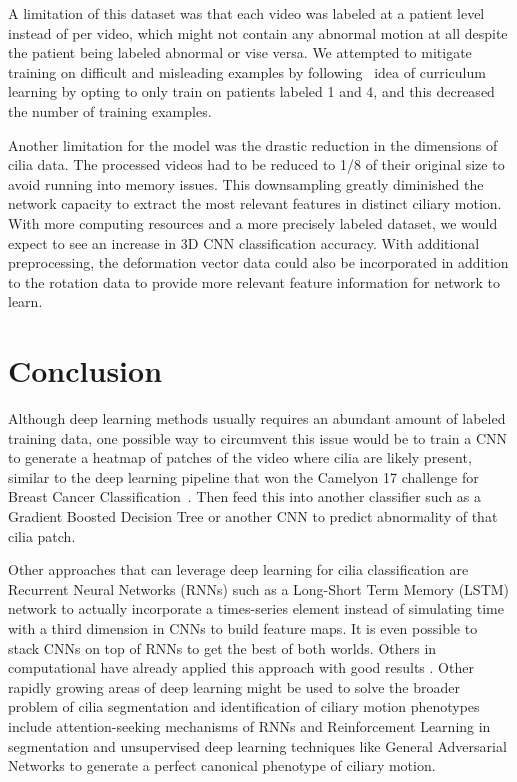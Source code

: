 A limitation of this dataset was that each video was labeled at a patient level instead of per video, which might not contain any abnormal motion at all despite the patient being labeled abnormal or vise versa. We attempted to mitigate training on difficult and misleading examples by following~\cite{bengio2009curriculum} idea of curriculum learning by opting to only train on patients labeled 1 and 4, and this decreased the number of training examples.

Another limitation for the model was the drastic reduction in the dimensions of cilia data. The processed videos had to be reduced to 1/8 of their original size to avoid running into memory issues. This downsampling greatly diminished the network capacity to extract the most relevant features in distinct ciliary motion. With more computing resources and a more precisely labeled dataset, we would expect to see an increase in 3D CNN classification accuracy. With additional preprocessing, the deformation vector data could also be incorporated in addition to the rotation data to provide more relevant feature information for network to learn.

\section{Conclusion}

Although deep learning methods usually requires an abundant amount of labeled training data, one possible way to circumvent this issue would be to train a CNN to generate a heatmap of patches of the video where cilia are likely present, similar to the deep learning pipeline that won the Camelyon 17 challenge for Breast Cancer Classification~\cite{wang2016deep}. Then feed this into another classifier such as a Gradient Boosted Decision Tree or another CNN to predict abnormality of that cilia patch.
 
Other approaches that can leverage deep learning for cilia classification are Recurrent Neural Networks (RNNs) such as a Long-Short Term Memory (LSTM) network to actually incorporate a times-series element instead of simulating time with a third dimension in CNNs to build feature maps. It is even possible to stack CNNs on top of RNNs to get the best of both worlds. Others in computational have already applied this approach with good results \cite{sonderby2015convolutional}. Other rapidly growing areas of deep learning might be used to solve the broader problem of cilia segmentation and identification of ciliary motion phenotypes include attention-seeking mechanisms of RNNs and Reinforcement Learning in segmentation and  unsupervised deep learning techniques like General Adversarial Networks to generate a perfect canonical phenotype of ciliary motion.

